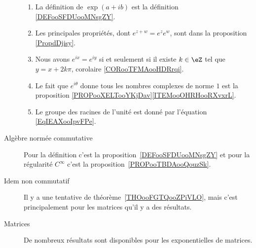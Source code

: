 \begin{description}
		\begin{enumerate}
			\item
			      La définition de \( \exp(a+ib)\) est la définition \ref{DEFooSFDUooMNsgZY}.
			\item
			      Les principales propriétés, dont \(  e^{z+w}= e^{z} e^{w}\), sont dans la proposition \ref{PropdDjisy}.
			\item
			      Nous avons \(  e^{ix}= e^{iy}\) si et seulement si il existe \( k\in\eZ\) tel que \( y=x+2k\pi\), corolaire \ref{CORooTFMAooHDRrqi}.
			\item
			      Le fait que \(  e^{i\theta}\) donne tous les nombres complexes de norme \( 1\) est la proposition \ref{PROPooXELTooYKjDav}\ref{ITEMooOHRHooRXvxrL}.
			\item
			      Le groupe des racines de l'unité est donné par l'équation \eqref{EqIEAXooIpvFPe}.
		\end{enumerate}

	\item[Algèbre normée commutative]

		Pour la définition c'est la proposition~\ref{DEFooSFDUooMNsgZY} et pour la régularité \(  C^{\infty}\) c'est la proposition~\ref{PROPooTBDAooQouzSk}.

	\item[Idem non commutatif]

		Il y a une tentative de théorème~\ref{THOooFGTQooZPiVLO}, mais c'est principalement pour les matrices qu'il y a des résultats.

	\item[Matrices]

		De nombreux résultats sont disponibles pour les exponentielles de matrices.


\end{description}
